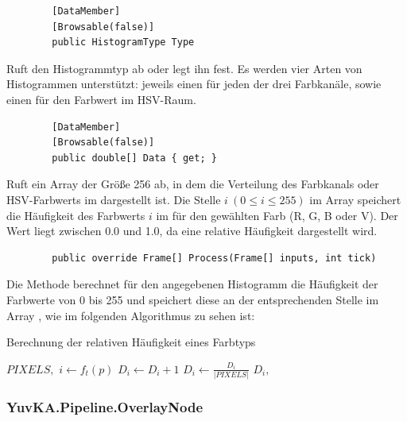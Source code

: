 \begin{itemize}
	\begin{verbatim}
		[DataMember]
		[Browsable(false)]
		public HistogramType Type
	\end{verbatim}
	Ruft den Histogrammtyp ab oder legt ihn fest. Es werden vier Arten von Histogrammen unterstützt: jeweils einen für jeden der drei Farbkanäle, sowie einen für den Farbwert im HSV-Raum.
	
	\begin{verbatim}
		[DataMember]
		[Browsable(false)]
		public double[] Data { get; }
	\end{verbatim}
	Ruft ein Array der Größe 256 ab, in dem die Verteilung des Farbkanals oder HSV-Farbwerts im  dargestellt ist. Die Stelle $ i \ (0 \leq i \leq 255) $ im Array speichert die Häufigkeit des Farbwerts $ i $ im  für den gewählten Farb (R, G, B oder V). Der Wert liegt zwischen 0.0 und 1.0, da eine relative Häufigkeit dargestellt wird.

	\begin{verbatim}
		public override Frame[] Process(Frame[] inputs, int tick)
	\end{verbatim}
	Die Methode  berechnet für den angegebenen Histogramm die Häufigkeit der Farbwerte von 0 bis 255 und speichert diese an der entsprechenden Stelle im Array , wie im folgenden Algorithmus zu sehen ist:
	\begin{algorithm}[H]
		\caption{Berechnung der relativen Häufigkeit eines Farbtyps}
		\begin{algorithmic}[1]
			\REQUIRE $ PIXELS, $ 
			\STATE {}
				\STATE $ i \gets f_{t}(p) $
				\STATE $ D_i \gets D_i + 1 $
			\ENDFOR
				\STATE $ D_i \gets \frac{D_i}{|PIXELS|} $
			\ENDFOR
			\ENSURE $ D_i, $ 
		\end{algorithmic}
	\end{algorithm}

\end{itemize}

\subsubsection{YuvKA.Pipeline.OverlayNode}

